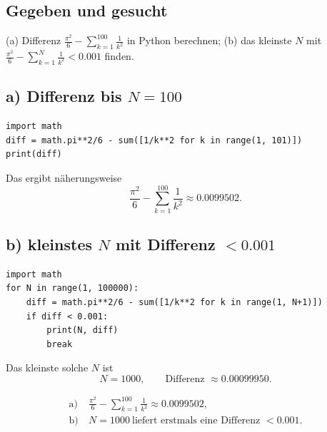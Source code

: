 

\subsection*{Gegeben und gesucht}
(a) Differenz $\tfrac{\pi^2}6-\sum_{k=1}^{100}\frac1{k^2}$ in Python
berechnen; (b) das kleinste $N$ mit $\tfrac{\pi^2}6-\sum_{k=1}^{N}\frac1{k^2}<0.001$ finden.

\subsection*{a) Differenz bis $N=100$}
\begin{verbatim}
import math
diff = math.pi**2/6 - sum([1/k**2 for k in range(1, 101)])
print(diff)
\end{verbatim}
Das ergibt n\"aherungsweise
\begin{equation}
  \frac{\pi^2}6-\sum_{k=1}^{100}\frac1{k^2}
  \approx 0.0099502 .
\end{equation}

\subsection*{b) kleinstes $N$ mit Differenz $<0.001$}
\begin{verbatim}
import math
for N in range(1, 100000):
    diff = math.pi**2/6 - sum([1/k**2 for k in range(1, N+1)])
    if diff < 0.001:
        print(N, diff)
        break
\end{verbatim}
Das kleinste solche $N$ ist
\begin{equation}
  N=1000,\qquad \text{Differenz }\approx0.00099950.
\end{equation}

\begin{ergebnis}
\begin{align*}
  \text{a)}&\ \frac{\pi^2}6-\sum_{k=1}^{100}\frac1{k^2}\approx0.0099502,\\
  \text{b)}&\ N=1000\ \text{liefert erstmals eine Differenz }<0.001.
\end{align*}
\end{ergebnis}

